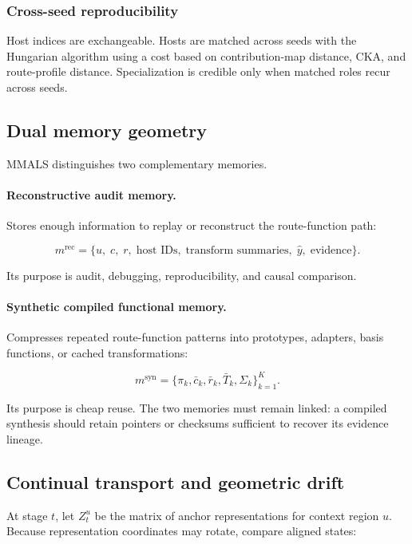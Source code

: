 \documentclass[11pt,a4paper]{article}
\begin{document}
\subsubsection{Cross-seed reproducibility}

Host indices are exchangeable. Hosts are matched across seeds with the Hungarian algorithm using a cost based on contribution-map distance, CKA, and route-profile distance. Specialization is credible only when matched roles recur across seeds.

\subsection{Dual memory geometry}

MMALS distinguishes two complementary memories.

\paragraph{Reconstructive audit memory.}
Stores enough information to replay or reconstruct the route-function path:

\begin{equation}
 m^{\mathrm{rec}}=\{u,\;c,\;r,\;\text{host IDs},\;\text{transform summaries},\;\hat y,\;\text{evidence}\}.
\end{equation}

Its purpose is audit, debugging, reproducibility, and causal comparison.

\paragraph{Synthetic compiled functional memory.}
Compresses repeated route-function patterns into prototypes, adapters, basis functions, or cached transformations:

\begin{equation}
 m^{\mathrm{syn}}=\{\pi_k,\bar c_k,\bar r_k,\bar T_k,\Sigma_k\}_{k=1}^K.
\end{equation}

Its purpose is cheap reuse. The two memories must remain linked: a compiled synthesis should retain pointers or checksums sufficient to recover its evidence lineage.

\subsection{Continual transport and geometric drift}

At stage \(t\), let \(Z_t^u\) be the matrix of anchor representations for context region \(u\). Because representation coordinates may rotate, compare aligned states:
\end{document}
